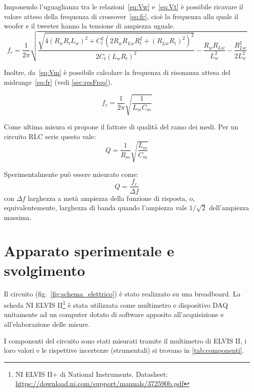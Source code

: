 \documentclass[12pt,italian]{article}
\begin{document}
Imponendo l'uguaglianza tra le relazioni~\eqref{eq:Vw} e~\eqref{eq:Vt} è
possibile ricavare il valore atteso della frequenza di crossover~\eqref{eq:fc},
cioè la frequenza alla quale il woofer e il tweeter hanno la tensione di
ampiezza uguale.
\begin{equation}
	\label{eq:fc}
	f_{c} = \frac{1}{2\pi}\sqrt{\frac{\sqrt{4 {(R_{w} R_{t} L_{w})}^2 + C_{t}^2{(2
	R_{w} R_{Lw} R_{t}^2 + {(R_{Lw} R_{t})}^2)}^2}}{2 C _{t} {(L_{w} R_{t})}^2 } -
	\frac{R_{w} R_{Lw}}{L_{w}^2} - \frac{R_{Lw}^2}{2 L_{w}^2}}
\end{equation}

Inoltre, da~\eqref{eq:Vm} è possibile calcolare la frequenza di risonanza
attesa del midrange~\eqref{eq:fr} (vedi \cref{sec:resFreq}).

\begin{equation}
	\label{eq:fr}
	f_{r} = \frac{1}{2\pi}\sqrt{\frac{1}{L_{m} C_{m}}}  %
\end{equation}

Come ultima misura si propone il fattore di qualità del ramo dei medi. Per un
circuito RLC serie questo vale:
\begin{equation*}
	Q =	\frac{1}{R_m}\sqrt{\frac{L_m}{C_m}}
\end{equation*}

\noindent
Sperimentalmente può essere
misurato come:
\begin{equation*}
	Q = \frac{f_r}{\Delta f}
\end{equation*}
con $\Delta f$ larghezza a metà ampiezza della funzione di risposta, o,
equivalentemente, larghezza di banda quando l'ampiezza vale $1/\sqrt{2}$
dell'ampiezza massima.

\section*{Apparato sperimentale e svolgimento}

Il circuito (fig.~\ref{fig:schema_elettrico}) è stato realizzato su una
breadboard. La scheda NI ELVIS II\footnote{NI ELVIS II+ di National
	Instruments. Datasheet:
	\url{https://download.ni.com/support/manuals/372590b.pdf}} è stata utilizzata
come multimetro e dispositivo DAQ unitamente ad un computer dotato di software
apposito all'acquisizione e all'elaborazione delle misure.

I componenti del circuito sono stati misurati tramite il multimetro di ELVIS
II, i loro valori e le rispettive incertezze (strumentali) si trovano in
\cref{tab:componenti}.
\end{document}

